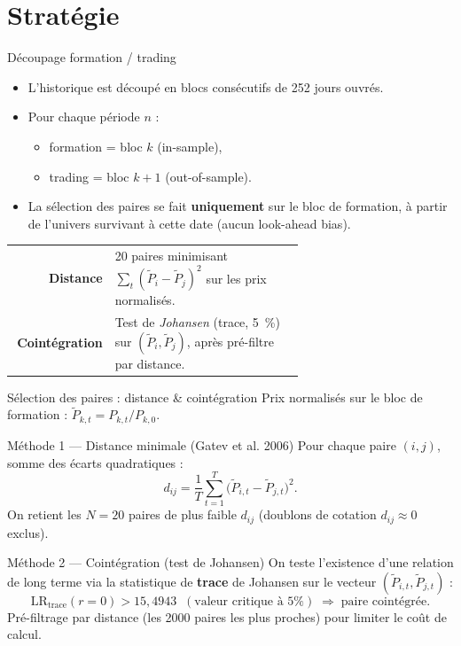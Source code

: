 \documentclass[10pt,aspectratio=169]{beamer}
\begin{document}
\section{Stratégie}
\begin{frame}{Découpage formation / trading}
  \begin{itemize}
    \item L'historique est découpé en blocs consécutifs de 252 jours ouvrés.
    \item Pour chaque période $n$ :
      \begin{itemize}
        \item formation = bloc $k$ (in-sample),
        \item trading  = bloc $k+1$ (out-of-sample).
      \end{itemize}
    \item La sélection des paires se fait \textbf{uniquement} sur le bloc de
          formation, à partir de l'univers survivant à cette date
          (aucun look-ahead bias).
  \end{itemize}

  \vskip6pt
  \begin{center}
    \scriptsize
    \begin{tabular}{>{\bfseries}r p{0.65\linewidth}}
      \toprule
      Distance      & 20 paires minimisant $\sum_t (\tilde{P}_i - \tilde{P}_j)^2$ sur les prix normalisés. \\
      Cointégration & Test de \emph{Johansen} (trace, 5~\%) sur $(\tilde{P}_i,\tilde{P}_j)$, après pré-filtre par distance. \\
      \bottomrule
    \end{tabular}
  \end{center}
\end{frame}

\begin{frame}{Sélection des paires : distance \& cointégration}
  \small
  Prix normalisés sur le bloc de formation : $\tilde{P}_{k,t} = P_{k,t}/P_{k,0}$.
  \vskip4pt
  \begin{block}{Méthode 1 --- Distance minimale (Gatev et al. 2006)}
    Pour chaque paire $(i,j)$, somme des écarts quadratiques :
    \[ d_{ij} = \frac{1}{T}\sum_{t=1}^{T}\bigl(\tilde{P}_{i,t} - \tilde{P}_{j,t}\bigr)^2 . \]
    On retient les $N = 20$ paires de plus faible $d_{ij}$ (doublons de
    cotation $d_{ij}\approx 0$ exclus).
  \end{block}
  \begin{block}{Méthode 2 --- Cointégration (test de Johansen)}
    On teste l'existence d'une relation de long terme via la statistique de
    \textbf{trace} de Johansen sur le vecteur $(\tilde{P}_{i,t},\tilde{P}_{j,t})$ :
    \[ \mathrm{LR}_{\text{trace}}(r{=}0) > 15{,}4943 \;\;(\text{valeur critique à }5\%) \;\Rightarrow\; \text{paire cointégrée}. \]
    Pré-filtrage par distance (les 2000 paires les plus proches) pour limiter
    le coût de calcul.
  \end{block}
\end{frame}
\end{document}
